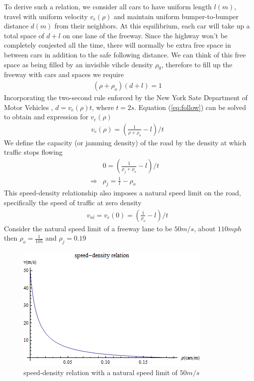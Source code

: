 	To derive such a relation, we consider all cars to have uniform length $l(m)$, travel with uniform velocity $v_e(\rho)$ and maintain uniform bumper-to-bumper distance $d(m)$ from their neighbors. At this equilibrium, each car will take up a total space of $d+l$ on one lane of the freeway. Since the highway won't be completely conjested all the time, there will normally be extra free space in between cars in addition to the safe following distance. We can think of this free space as being filled by an invisible vihcle density $\rho_0$, therefore to fill up the freeway with cars and spaces we require
	\begin{align}
	& (\rho + \rho_o)(d+l) = 1 & \label{eq:follow}
	\end{align}
	Incorporating the two-second rule enforced by the New York Sate Department of Motor Vehicles \cite{science_writing}, $d=v_e(\rho)t$, where $t=2s$. Equation (\ref{eq:follow}) can be solved to obtain and expression for $v_e(\rho)$
	\begin{align}
	& v_e(\rho) =  (\frac{1}{\rho+\rho_o}-l)/t& 
	\end{align}
	We define the capacity (or jamming density) of the road by the density at which traffic stops flowing
	\begin{align}
	& 0 =  (\frac{1}{\rho_j+\rho_o}-l)/t & \\
	\Rightarrow & \rho_j=\frac{1}{l}-\rho_o &
	\end{align}
	This speed-density relationship also imposes a natural speed limit on the road, specifically the speed of traffic at zero density
	\begin{align}
	& v_{nl} = v_e(0) =  (\frac{1}{\rho_o}-l)/t &
	\end{align}
	Consider the natural speed limit of a freeway lane to be $50m/s$, about $110mph$ then $\rho_o=\frac{1}{105}$ and $\rho_j=0.19$
	\begin{figure}[h]
	\includegraphics[scale=.6]{plot/speed_density}
	\caption{speed-density relation with a natural speed limit of $50m/s$}
	\end{figure}
	

